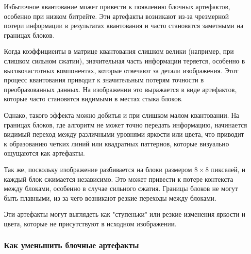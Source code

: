 \YQuantize

\CbCrQuantize

Избыточное квантование может привести к появлению блочных артефактов, особенно при низком битрейте. 
Эти артефакты возникают из-за чрезмерной потери информации в результатах квантования и часто становятся заметными на границах блоков.

Когда коэффициенты в матрице квантования слишком велики (например, при слишком сильном сжатии), 
значительная часть информации теряется, особенно в высокочастотных компонентах, которые отвечают за детали изображения. 
Этот процесс квантования приводит к значительным потерям точности в преобразованных данных. 
На изображении это выражается в виде артефактов, которые часто становятся видимыми в местах стыка блоков.

Однако, такого эффекта можно добитья и при слишком малом квантовании.
На границах блоков, где алгоритм не может точно передать информацию, 
начинается видимый переход между различными уровнями яркости или цвета, 
что приводит к образованию четких линий или квадратных паттернов, которые визуально ощущаются как артефакты.

Так же, поскольку изображение разбивается на блоки размером $8 \times 8$ пикселей, и каждый блок сжимается независимо. 
Это может привести к потере контекста между блоками, особенно в случае сильного сжатия. 
Границы блоков не могут быть плавными, из-за чего возникают резкие переходы между блоками.

Эти артефакты могут выглядеть как "ступеньки" или резкие изменения яркости и цвета, которые не присутствуют в исходном изображении.

\subsubsection{Как уменьшить блочные артефакты}

